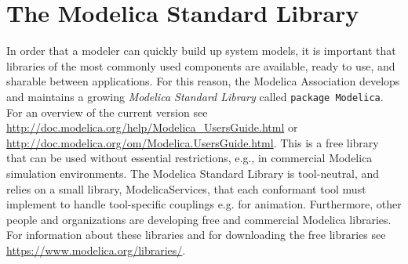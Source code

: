 \chapter{The Modelica Standard Library}

In order that a modeler can quickly build up system models, it is
important that libraries of the most commonly used components are
available, ready to use, and sharable between applications. For this
reason, the Modelica Association develops and maintains a growing
\emph{Modelica Standard Library} called \lstinline[basicstyle=\ttfamily]!package Modelica!. For an
overview of the current version see
\url{http://doc.modelica.org/help/Modelica_UsersGuide.html} or
\url{http://doc.modelica.org/om/Modelica.UsersGuide.html}. This is a
free library that can be used without essential restrictions, e.g., in
commercial Modelica simulation environments. The Modelica Standard
Library is tool-neutral, and relies on a small library,
ModelicaServices, that each conformant tool must implement to handle
tool-specific couplings e.g. for animation. Furthermore, other people
and organizations are developing free and commercial Modelica libraries.
For information about these libraries and for downloading the free
libraries see \url{https://www.modelica.org/libraries/}.
